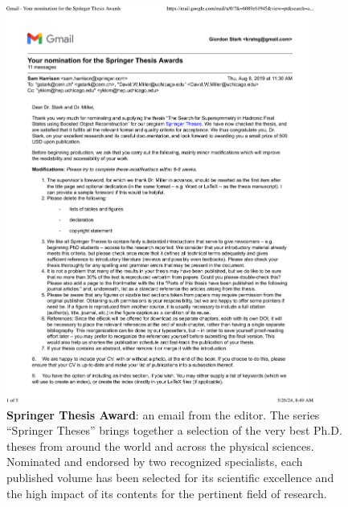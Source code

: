 \begin{figure}[h!]
	\centering
	\caption{\textbf{Springer Thesis Award}: an email from the editor. The series \enquote{Springer Theses} brings together a selection of the very best Ph.D. theses from around the world and across the physical sciences. Nominated and endorsed by two recognized specialists, each published volume has been selected for its scientific excellence and the high impact of its contents for the pertinent field of research.}
	\includegraphics[width=0.9\textwidth]{attachments/D-research/springerThesisAward}
\end{figure}

